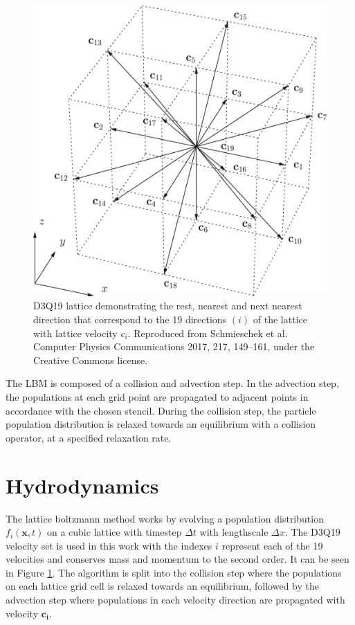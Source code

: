 \begin{figure}[h]
    \centering
    \includegraphics[scale = 1]{figures/methods/d3q19_lattice.jpg}
    \caption{D3Q19 lattice demonstrating the rest, nearest and next nearest direction that correspond to the 19 
    directions $(i)$ of the lattice with lattice velocity $c_{i}$. \cite{schmieschek_lb3d_2017} Reproduced from 
    Schmieschek et al. Computer Physics Communications 2017, 217, 149--161, under the Creative Commons license.}
    \label{fig:d3q19_lattice}
\end{figure}

The LBM is composed of a collision and advection step. In the advection step, the populations at each grid point are propagated to adjacent points in accordance 
with the chosen stencil. During the collision step, the particle population distribution is relaxed towards an equilibrium with a collision operator, at a 
specified relaxation rate. 

\section{Hydrodynamics} 
\label{section:lbm_hydrodynamics}

The lattice boltzmann method works by evolving a population distribution $f_{i}(\mathbf{x}, t)$ on a cubic lattice with 
timestep $\Delta t$ with lengthscale $\Delta x$. \cite{qian_lattice_1992, succi_lattice_2018, he_theory_1997} The D3Q19 
velocity set is used in this work with the indexes $i$ represent each of the 19 velocities and conserves mass and momentum 
to the second order. It can be seen in Figure \ref{fig:d3q19_lattice}. The algorithm is split into the 
collision step where the populations on each lattice grid cell is relaxed towards an equilibrium, followed by the 
advection step where populations in each velocity direction are propagated with velocity $\mathbf{c_i}$. 

